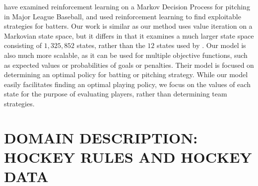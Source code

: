 \documentclass[]{article}
\begin{document}
\citep{Sidhu2014} have examined reinforcement learning on a Markov Decision Process for pitching in Major League Baseball, and used reinforcement learning to find exploitable strategies for batters. Our work is similar as our method uses value iteration on a Markovian state space, but it differs in that it examines a much larger state space consisting of $1,325,852$ states, rather than the $12$ states used by \citep{Sidhu2014}. Our model is also much more scalable, as it can be used for multiple objective functions, such as expected values or probabilities of goals or penalties. Their model is focused on determining an optimal policy for batting or pitching strategy. While our model easily facilitates finding an optimal playing policy, we focus on the values of each state for the purpose of evaluating players, rather than determining team strategies.

%
%



\section{DOMAIN DESCRIPTION: HOCKEY RULES AND HOCKEY DATA}
\label{sec:background-notation}
\end{document}
